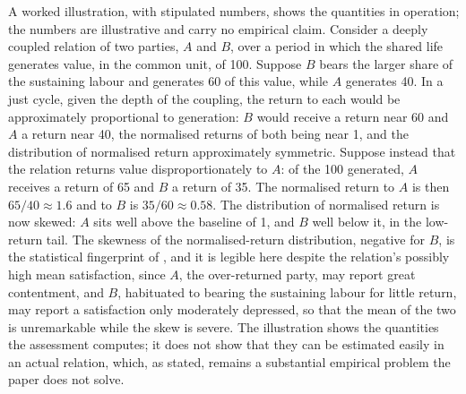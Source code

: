 A worked illustration, with stipulated numbers, shows the quantities in operation; the numbers are illustrative and carry no empirical claim. Consider a deeply coupled relation of two parties, $A$ and $B$, over a period in which the shared life generates value, in the common unit, of 100. Suppose $B$ bears the larger share of the sustaining labour and generates 60 of this value, while $A$ generates 40. In a just cycle, given the depth of the coupling, the return to each would be approximately proportional to generation: $B$ would receive a return near 60 and $A$ a return near 40, the normalised returns of both being near 1, and the distribution of normalised return approximately symmetric. Suppose instead that the relation returns value disproportionately to $A$: of the 100 generated, $A$ receives a return of 65 and $B$ a return of 35. The normalised return to $A$ is then $65/40 \approx 1.6$ and to $B$ is $35/60 \approx 0.58$. The distribution of normalised return is now skewed: $A$ sits well above the baseline of 1, and $B$ well below it, in the low-return tail. The skewness of the normalised-return distribution, negative for $B$, is the statistical fingerprint of , and it is legible here despite the relation's possibly high mean satisfaction, since $A$, the over-returned party, may report great contentment, and $B$, habituated to bearing the sustaining labour for little return, may report a satisfaction only moderately depressed, so that the mean of the two is unremarkable while the skew is severe. The illustration shows the quantities the assessment computes; it does not show that they can be estimated easily in an actual relation, which, as  stated, remains a substantial empirical problem the paper does not solve.
